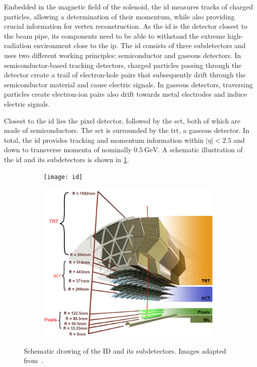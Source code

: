 Embedded in the magnetic field of the solenoid, the \gls{id} measures tracks of charged particles, allowing a determination of their momentum, while also providing crucial information for vertex reconstruction. As the \gls{id} is the detector closest to the beam pipe, its components need to be able to withstand the extreme high-radiation environment close to the \gls{ip}. The \gls{id} consists of three subdetectors and uses two different working principles: semiconductor and gaseous detectors. In semiconductor-based tracking detectors, charged particles passing through the detector create a trail of electron-hole pairs that subsequently drift through the semiconductor material and cause electric signals. In gaseous detectors, traversing particles create electron-ion pairs also drift towards metal electrodes and induce electric signals.

 Closest to the \gls{id} lies the pixel detector, followed by the \gls{sct}, both of which are made of semiconductors. The \gls{sct} is surrounded by the \gls{trt}, a gaseous detector. In total, the \gls{id} provides tracking and momentum information within $\vert\eta\vert < 2.5$ and down to transverse momenta of nominally $\SI{0.5}{\GeV}$. A schematic illustration of the \gls{id} and its subdetectors is shown in \cref{fig:ID_schematic}. 

\begin{figure}
	\centering
	\begin{subfigure}[b]{0.45\linewidth}
		\centering\texttt{[image: id]}
	\end{subfigure}%
	\begin{subfigure}[b]{0.45\linewidth}
		\centering\includegraphics[width=\textwidth]{ibl}
	\end{subfigure}%
	\caption{Schematic drawing of the ID and its subdetectors. Images adapted from~\cite{Pequenao:1095926, Potamianos:2209070}.}\label{fig:ID_schematic}
\end{figure}

